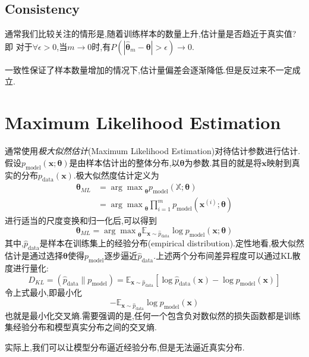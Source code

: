 \subsection{Consistency}\label{subsec:consistency}

通常我们比较关注的情形是,随着训练样本的数量上升,估计量是否趋近于真实值?即
对于$\forall\epsilon>0$,当$m\to0$时,有$P(|\hat{\bm\theta}_m-{\bm\theta}|>\epsilon)\to0$.

一致性保证了样本数量增加的情况下,估计量偏差会逐渐降低.但是反过来不一定成立.

\section{Maximum Likelihood Estimation}

通常使用\textit{极大似然估计}(Maximum Likelihood Estimation)对待估计参数进行估计.假设$p_{\text{model}}(\bm x;{\bm\theta})$是由样本估计出的整体分布,以${\bm\theta}$为参数.其目的就是将$\bm x$映射到真实的分布$p_{\text{data}}(\bm x)$.极大似然度估计定义为
\begin{equation}\begin{split}
{\bm\theta}_{ML}&={\arg\max}_{{\bm\theta}}p_{\text{model}}(\mathbb X;{\bm\theta})\\
&={\arg\max}_{{\bm\theta}}\prod_{i=1}^mp_{\text{model}}(\bm x^{(i)};{\bm\theta})
\end{split}\end{equation}
进行适当的尺度变换和归一化后,可以得到
\begin{equation}
{\bm\theta}_{ML}={\arg\max}_{{\bm\theta}}\mathbb E_{\bm x\sim\hat p_{\text{data}}}\log p_{\text{model}}(\bm x;{\bm\theta})
\end{equation}
其中,$\hat p_{\text{data}}$是样本在训练集上的经验分布(empirical distribution).定性地看,极大似然估计是通过选择${\bm\theta}$使得$p_{\text{model}}$逐步逼近$\hat p_{\text{data}}$.上述两个分布间差异程度可以通过KL散度进行量化:
\begin{equation}
D_{KL}=(\hat p_{\text{data}}\|p_{\text{model}})=\mathbb E_{\bm x\sim\hat p_{\text{data}}}[\log\hat p_{\text{data}}(\bm x)-\log p_{\text{model}}(\bm x)]
\end{equation}
令上式最小,即最小化
\begin{equation}
-\mathbb E_{\bm x\sim\hat p_{\text{data}}}\log p_{\text{model}}(\bm x)
\end{equation}
也就是最小化交叉熵.需要强调的是,任何一个包含负对数似然的损失函数都是训练集经验分布和模型真实分布之间的交叉熵.

实际上,我们可以让模型分布逼近经验分布,但是无法逼近真实分布.

